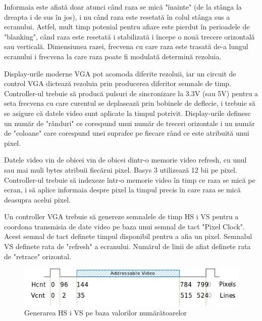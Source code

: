 \documentclass[a4paper,11pt,romanian]{article}
\begin{document}
{Informaia este afiat\u{a} doar atunci c\^{a}nd raza se mic\u{a} "\^{i}nainte" (de la st\^{a}nga la dreapta i de sus \^{i}n jos), i nu c\^{a}nd raza este resetat\u{a} \^{i}n colul st\^{a}nga sus a ecranului. Astfel, mult timp potenial pentru afiare este pierdut \^{i}n perioadele de "blanking", c\^{a}nd raza este resetat\u{a} i stabilizat\u{a} i \^{i}ncepe o nou\u{a} trecere orizontal\u{a} sau vertical\u{a}. Dimensiunea razei, frecvena cu care raza este trasat\u{a} de-a lungul ecranului i frecvena la care raza poate fi modulat\u{a} determin\u{a} rezoluia.

Display-urile moderne VGA pot acomoda diferite rezoluii, iar un circuit de control VGA dicteaz\u{a} rezoluia prin producerea diferitor semnale de timp. Controller-ul trebuie s\u{a} produc\u{a} pulsuri de sincronizare la 3.3V (sau 5V) pentru a seta frecvena cu care curentul se deplaseaz\u{a} prin bobinele de deflecie, i trebuie s\u{a} se asigure c\u{a} datele video sunt aplicate la timpul potrivit. Display-urile definesc un num\u{a}r de "r\^{a}nduri" ce corespund unui num\u{a}r de treceri orizontale i un num\u{a}r de "coloane" care corespund unei suprafee pe fiecare r\^{a}nd ce este atribuit\u{a} unui pixel.

Datele video vin de obicei vin de obicei dintr-o memorie video refresh, cu unul sau mai muli bytes atribuii fiec\u{a}rui pixel. Basys 3 utilizeaz\u{a} 12 bii pe pixel. Controller-ul trebuie s\u{a} indexeze \^{i}ntr-o memorie video \^{i}n timp ce raza se mic\u{a} pe ecran, i s\u{a} aplice informaia despre pixel la timpul precis \^{i}n care raza se mic\u{a} deasupra acelui pixel.

Un controller VGA trebuie s\u{a} genereze semnalele de timp HS i VS pentru a coordona transmisia de date video pe baza unui semnal de tact "Pixel Clock". Acest semnal de tact definete timpul disponibil pentru a afia un pixel. Semnalul VS definete rata de "refresh" a ecranului. Num\u{a}rul de linii de afiat definete rata de "retrace" orizontal. ~\cite{misc:digilent}

\begin{figure}
  \begin{center}
   \includegraphics[scale=0.5]{VGA_HSVS.png}
   \caption{Generarea HS i VS pe baza valorilor num\u{a}r\u{a}toarelor}
   \label{fig:hsvsgen}
  \end{center}
 \end{figure}

}
\end{document}
